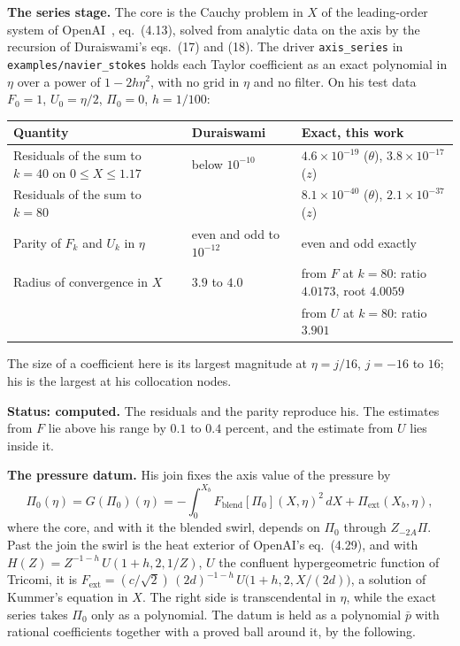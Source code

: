 \textbf{The series stage.} The core is the Cauchy problem in $X$ of the leading-order system of
OpenAI~\cite{src:OpenAI-2026-Navier-Stokes}, eq.\ (4.13), solved from analytic data on the axis by
the recursion of Duraiswami's eqs.\ (17) and (18). The driver \texttt{axis\_series} in
\texttt{examples/navier\_stokes} holds each Taylor coefficient as an exact polynomial in $\eta$
over a power of $1 - 2h\eta^2$, with no grid in $\eta$ and no filter. On his test data
$F_0 = 1$, $U_0 = \eta/2$, $\Pi_0 = 0$, $h = 1/100$:

\begin{center}
\small
\begin{tabular}{@{}lll@{}}
\toprule
Quantity & Duraiswami & Exact, this work \\
\midrule
Residuals of the sum to $k = 40$ on $0 \le X \le 1.17$ & below $10^{-10}$ & $4.6\times 10^{-19}$ ($\theta$), $3.8\times 10^{-17}$ ($z$) \\
Residuals of the sum to $k = 80$ & & $8.1\times 10^{-40}$ ($\theta$), $2.1\times 10^{-37}$ ($z$) \\
Parity of $F_k$ and $U_k$ in $\eta$ & even and odd to $10^{-12}$ & even and odd exactly \\
Radius of convergence in $X$ & $3.9$ to $4.0$ & from $F$ at $k = 80$: ratio $4.0173$, root $4.0059$ \\
 & & from $U$ at $k = 80$: ratio $3.901$ \\
\bottomrule
\end{tabular}
\end{center}

The size of a coefficient here is its largest magnitude at $\eta = j/16$, $j = -16$ to $16$; his is
the largest at his collocation nodes.

\textbf{Status: computed.} The residuals and the parity reproduce his. The estimates from $F$ lie
above his range by $0.1$ to $0.4$ percent, and the estimate from $U$ lies inside it.

\textbf{The pressure datum.} His join fixes the axis value of the pressure by
\[
\Pi_0(\eta) = G(\Pi_0)(\eta) = -\int_0^{X_b} F_{\mathrm{blend}}[\Pi_0](X,\eta)^2\,dX
+ \Pi_{\mathrm{ext}}(X_b,\eta),
\]
where the core, and with it the blended swirl, depends on $\Pi_0$ through $Z_{-2A}\Pi$. Past the
join the swirl is the heat exterior of OpenAI's eq.\ (4.29), and with
$H(Z) = Z^{-1-h}\,U(1+h, 2, 1/Z)$, $U$ the confluent hypergeometric function of Tricomi, it is
$F_{\mathrm{ext}} = (c/\sqrt{2})\,(2d)^{-1-h}\,U\bigl(1+h, 2, X/(2d)\bigr)$, a solution of Kummer's
equation in $X$. The right
side is transcendental in $\eta$, while the exact series takes $\Pi_0$ only as a polynomial. The
datum is held as a polynomial $\bar p$ with rational coefficients together with a proved ball
around it, by the following.

